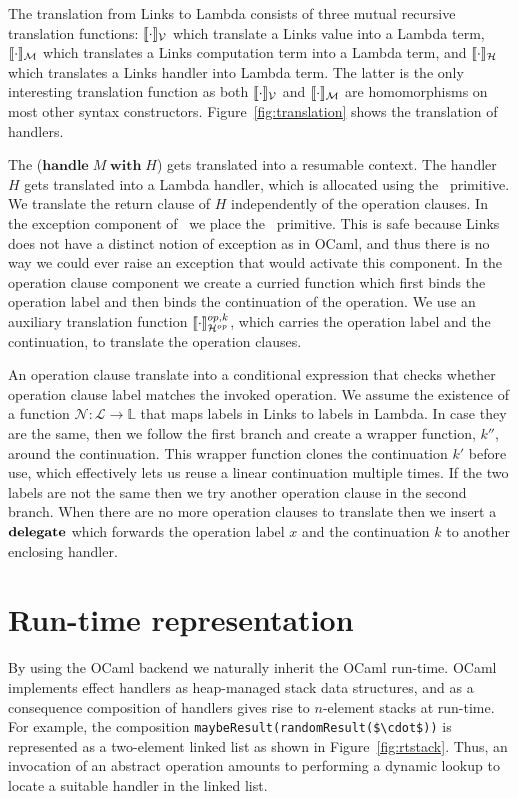 \documentclass[12pt,mscres,cdtppar,twoside,openright,logo,rightchapter,normalheadings]{infthesis}
\theoremstyle{definition}
\newcommand{\keyw}[1]{\textbf{#1}}
\newcommand{\Handle}{\keyw{handle}}
\newcommand{\With}{\keyw{with}}
\begin{document}
The translation from Links to Lambda consists of three mutual
recursive translation functions: $\llbracket \cdot \rrbracket_\mathcal{V}$ which translate a
Links value into a Lambda term, $\llbracket \cdot \rrbracket_\mathcal{M}$ which translates a
Links computation term into a Lambda term, and $\llbracket \cdot \rrbracket_\mathcal{H}$ which
translates a Links handler into Lambda term. The latter is the only
interesting translation function as both $\llbracket \cdot \rrbracket_\mathcal{V}$ and
$\llbracket \cdot \rrbracket_\mathcal{M}$ are homomorphisms on most other syntax constructors.
Figure~\ref{fig:translation} shows the translation of handlers.

The ($\Handle\; M \; \With\; H$) gets translated into a resumable
context. The handler $H$ gets translated into a Lambda handler, which
is allocated using the \Alloc\ primitive. We translate the
return clause of $H$ independently of the operation clauses. In the
exception component of \Alloc\ we place the \Error\ primitive. This is
safe because Links does not have a distinct notion of exception as in
OCaml, and thus there is no way we could ever raise an exception that
would activate this component. In the operation clause component we
create a curried function which first binds the operation label and
then binds the continuation of the operation. We use an auxiliary
translation function $\llbracket \cdot \rrbracket_{\mathcal{H}^{op}}^{op,k}$, which carries the
operation label and the continuation, to translate the operation
clauses.

An operation clause translate into a conditional expression that
checks whether operation clause label matches the invoked
operation. We assume the existence of a function
$\mathcal{N} : \mathcal{L} \to \mathbb{L}$ that maps labels in Links
to labels in Lambda. In case they are the same, then we follow the
first branch and create a wrapper function, $k''$, around the
continuation. This wrapper function clones the continuation $k'$
before use, which effectively lets us reuse a linear continuation
multiple times. If the two labels are not the same then we try another
operation clause in the second branch. When there are no more
operation clauses to translate then we insert a $\Delegate$ which
forwards the operation label $x$ and the continuation $k$ to another
enclosing handler.

\section{Run-time representation}
\label{sec:representation}
By using the OCaml backend we naturally inherit the OCaml
run-time. OCaml implements effect handlers as heap-managed stack data
structures, and as a consequence composition of handlers gives rise to
$n$-element stacks at run-time. For example, the composition
\lstinline[mathescape]!maybeResult(randomResult($\cdot$))! is
represented as a two-element linked list as shown in
Figure~\ref{fig:rtstack}. Thus, an invocation of an abstract operation
amounts to performing a dynamic lookup to locate a suitable handler in
the linked list.
\end{document}

